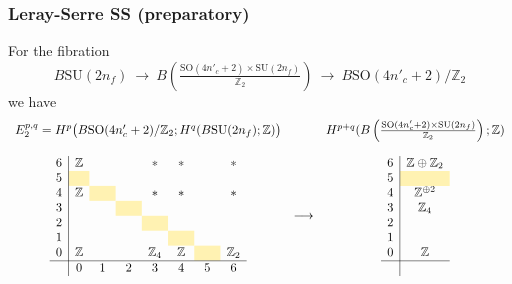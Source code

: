 \documentclass[12pt]{article}
\numberwithin{equation}{section}
\def\bZ{\mathbb{Z}}
\def\SU{\mathrm{SU}}
\def\SO{\mathrm{SO}}
\begin{document}
\subsubsection{Leray-Serre SS (preparatory)}
For the fibration
\begin{equation}
	B\SU(2n_f)
	\ \to\ 
	B\left(\tfrac{\SO(4n'_c+2)\times \SU(2n_f)}{\bZ_2}\right)
	\ \to\ 
	B\SO(4n'_c+2)/\bZ_2
\end{equation}
we have
\begin{equation}
	\begin{array}{ccc}
		E_2^{p,q}=H^p\big(B\SO(4n'_c+2)/\bZ_2;H^q(B\SU(2n_f);\bZ)\big) && H^{p+q}(B\left(\tfrac{\SO(4n'_c+2)\times \SU(2n_f)}{\bZ_2}\right);\bZ)\vspace{4mm}\\
		\begin{array}{c|ccccccccccccc}
			6  & \bZ &&& \ast & \ast && \ast\\
			5  & \cellcolor{lightyellow} & \hphantom{\bZ_2} & \hphantom{\bZ_2} & \hphantom{\bZ_2} & \hphantom{\bZ_2} & \hphantom{\bZ_2} \\
			4  & \bZ & \cellcolor{lightyellow} && \ast & \ast & & \ast\\
			3  &  && \cellcolor{lightyellow} &&&\\
			2  &&  && \cellcolor{lightyellow} &&\\
			1  &  &&  && \cellcolor{lightyellow} &&\\
			0 & \bZ &  && \bZ_4 & \bZ & \cellcolor{lightyellow} & \bZ_2\\
			\hline
			& 0 & 1 & 2 & 3 & 4 & 5 & 6 \\
		\end{array}
		& \longrightarrow & 
		\begin{array}{c|c}
			6  & \bZ\oplus \bZ_2\\
			5  & \cellcolor{lightyellow}\\
			4  & \bZ^{\oplus 2}\\
			3  & \bZ_4\\
			2  & \\
			1  & \\
			0 & \bZ\\
			\hline\\
		\end{array}
	\end{array}
\end{equation}
\end{document}

